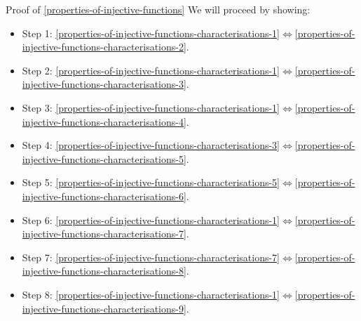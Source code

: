 \begin{Proof}{Proof of \cref{properties-of-injective-functions}}%
    We will proceed by showing:
    \begin{itemize}
        \item Step 1: \cref{properties-of-injective-functions-characterisations-1}$\iff$\cref{properties-of-injective-functions-characterisations-2}.
        \item Step 2: \cref{properties-of-injective-functions-characterisations-1}$\iff$\cref{properties-of-injective-functions-characterisations-3}.
        \item Step 3: \cref{properties-of-injective-functions-characterisations-1}$\iff$\cref{properties-of-injective-functions-characterisations-4}.
        \item Step 4: \cref{properties-of-injective-functions-characterisations-3}$\iff$\cref{properties-of-injective-functions-characterisations-5}.
        \item Step 5: \cref{properties-of-injective-functions-characterisations-5}$\iff$\cref{properties-of-injective-functions-characterisations-6}.
        \item Step 6: \cref{properties-of-injective-functions-characterisations-1}$\iff$\cref{properties-of-injective-functions-characterisations-7}.
        \item Step 7: \cref{properties-of-injective-functions-characterisations-7}$\iff$\cref{properties-of-injective-functions-characterisations-8}.
        \item Step 8: \cref{properties-of-injective-functions-characterisations-1}$\iff$\cref{properties-of-injective-functions-characterisations-9}.
    \end{itemize}


\end{Proof}
